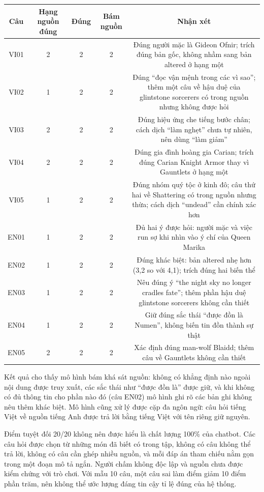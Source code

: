 \begin{longtable*}{|C{0.08}|C{0.09}|C{0.09}|C{0.09}|C{0.65}|}
\hline \textbf{Câu} & \textbf{Hạng nguồn đúng} & \textbf{Đúng} & \textbf{Bám nguồn} & \textbf{Nhận xét} \\ \hline
VI01 & 2 & 2 & 2 & Đúng người mặc là Gideon Ofnir; trích đúng bản gốc, không nhầm sang bản altered ở hạng một \\ \hline
VI02 & 1 & 2 & 2 & Đúng ``đọc vận mệnh trong các vì sao''; thêm một câu về hậu duệ của glintstone sorcerers có trong nguồn nhưng không được hỏi \\ \hline
VI03 & 2 & 2 & 2 & Đúng hiệu ứng che tiếng bước chân; cách dịch ``làm nghẹt'' chưa tự nhiên, nên dùng ``làm giảm'' \\ \hline
VI04 & 2 & 2 & 2 & Đúng gia đình hoàng gia Carian; trích đúng Carian Knight Armor thay vì Gauntlets ở hạng một \\ \hline
VI05 & 1 & 2 & 2 & Đúng nhóm quý tộc ở kinh đô; câu thứ hai về Shattering có trong nguồn nhưng thừa; cách dịch ``undead'' cần chính xác hơn \\ \hline
EN01 & 1 & 2 & 2 & Đủ hai ý được hỏi: người mặc và việc run sợ khi nhìn vào ý chí của Queen Marika \\ \hline
EN02 & 1 & 2 & 2 & Đúng khác biệt: bản altered nhẹ hơn (3,2 so với 4,1); trích đúng hai biến thể \\ \hline
EN03 & 1 & 2 & 2 & Nêu đúng ý ``the night sky no longer cradles fate''; thêm phần hậu duệ glintstone sorcerers không cần thiết \\ \hline
EN04 & 1 & 2 & 2 & Giữ đúng sắc thái ``được đồn là Numen'', không biến tin đồn thành sự thật \\ \hline
EN05 & 2 & 2 & 2 & Xác định đúng man-wolf Blaidd; thêm câu về Gauntlets không cần thiết \\ \hline
\end{longtable*}
\tabend


Kết quả cho thấy mô hình bám khá sát nguồn: không có khẳng định nào ngoài nội dung được truy xuất, các sắc thái như ``được đồn là'' được giữ, và khi không có đủ thông tin cho phần nào đó (câu EN02) mô hình ghi rõ các bản ghi không nêu thêm khác biệt. Mô hình cũng xử lý được cặp đa ngôn ngữ: câu hỏi tiếng Việt về nguồn tiếng Anh được trả lời bằng tiếng Việt với tên riêng giữ nguyên.


Điểm tuyệt đối 20/20 không nên được hiểu là chất lượng 100\% của chatbot. Các câu hỏi được chọn từ những món đã biết có trong tập, không có câu không thể trả lời, không có câu cần ghép nhiều nguồn, và mỗi đáp án tham chiếu nằm gọn trong một đoạn mô tả ngắn. Người chấm không độc lập và nguồn chưa được kiểm chứng với trò chơi. Với mẫu 10 câu, một câu sai làm điểm giảm 10 điểm phần trăm, nên không thể ước lượng đáng tin cậy tỉ lệ đúng của hệ thống.


